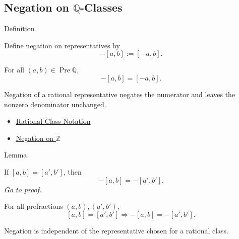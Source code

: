 \subsection*{\texorpdfstring{Negation on $\mathbb{Q}$-Classes}{Negation on Q-Classes}}

\begin{definitionbox}{Definition}
\begin{definition}
\label{def:negation-on-q-classes}
Define negation on representatives by
\[
-[a,b]:=[-a,b].
\]
\end{definition}
\end{definitionbox}

\begin{remark*}
For all $(a,b)\in\operatorname{Pre}\mathbb{Q}$,
\[
-[a,b]=[-a,b].
\]
\end{remark*}

\begin{remark*}[Interpretation]
Negation of a rational representative negates the numerator and leaves the
nonzero denominator unchanged.
\end{remark*}

\begin{dependencies}
\begin{itemize}
  \item \hyperref[def:rational-class-notation]{Rational Class Notation}
  \item \hyperref[def:negation-on-z-classes]{Negation on $\mathbb{Z}$}
\end{itemize}
\end{dependencies}

\begin{lemmabox}{Lemma}
\begin{lemma}
\label{lem:negation-on-q-respects-equivalence}
If $[a,b]=[a',b']$, then
\[
-[a,b]=-[a',b'].
\]
\hyperref[prf:negation-on-q-respects-equivalence]{\textit{Go to proof.}}
\end{lemma}
\end{lemmabox}

\begin{remark*}
For all prefractions $(a,b),(a',b')$,
\[
[a,b]=[a',b']\Longrightarrow -[a,b]=-[a',b'].
\]
\end{remark*}

\begin{remark*}[Interpretation]
Negation is independent of the representative chosen for a rational class.
\end{remark*}

